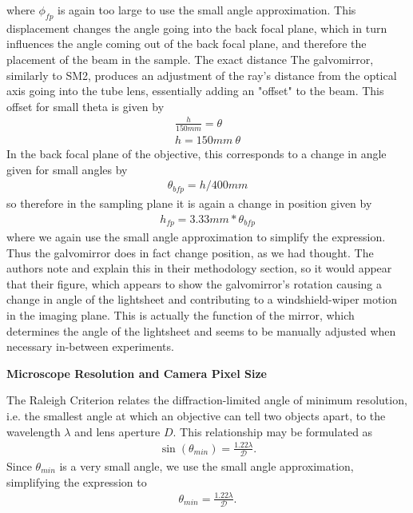 where $\phi_{fp}$ is again too large to use the small angle approximation.
This displacement changes the angle going into the back focal plane, which in turn influences the angle coming out of the back focal plane, and therefore the placement of the beam in the sample. The exact distance 
The galvomirror, similarly to SM2, produces an adjustment of the ray's distance from the optical axis going into the tube lens, essentially adding an "offset" to the beam. This offset for small theta is given by
\begin{gather}
    \frac{h}{150mm}=\theta\\
    h=150mm \ \theta
\end{gather}
In the back focal plane of the objective, this corresponds to a change in angle given for small angles by
\begin{gather}
    \theta_{bfp} = h/400mm
\end{gather} 
so therefore in the sampling plane it is again a change in position given by
\begin{gather}
    h_{fp} = 3.33mm*\theta_{bfp}
\end{gather}
where we again use the small angle approximation to simplify the expression.
Thus the galvomirror does in fact change position, as we had thought. The authors note and explain this in their methodology section, so it would appear that their figure, which appears to show the galvomirror's rotation causing a change in angle of the lightsheet and contributing to a windshield-wiper motion in the imaging plane. This is actually the function of the mirror, which determines the angle of the lightsheet and seems to be manually adjusted when necessary in-between experiments.
\newpage
\begin{center}
    \textbf{Microscope Resolution and Camera Pixel Size}\\
\end{center}
The Raleigh Criterion relates the diffraction-limited angle of minimum resolution, i.e. the smallest angle at which an objective can tell two objects apart, to the wavelength $\lambda$ and lens aperture $D$. This relationship may be formulated as
\begin{gather}
    \sin(\theta_{min}) = \frac{1.22\lambda}{\mathcal{D}}.
\end{gather}
Since $\theta_{min}$ is a very small angle, we use the small angle approximation, simplifying the expression to
\begin{gather}
    \theta_{min} = \frac{1.22\lambda}{\mathcal{D}}.
\end{gather}
